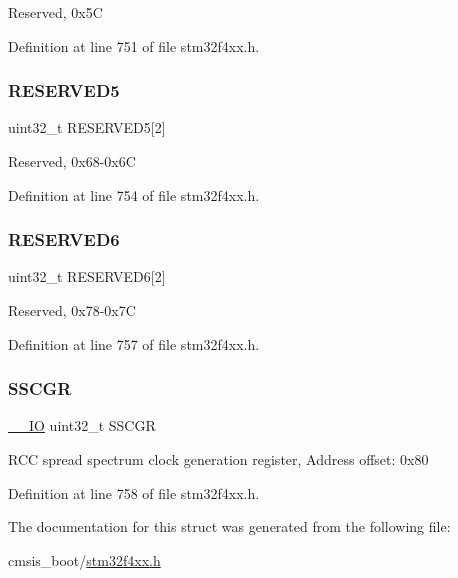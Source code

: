Reserved, 0x5C 

Definition at line 751 of file stm32f4xx.\+h.

\mbox{\label{struct_r_c_c___type_def_ac0eb05794aeee3b4ed69c8fe54c9be3b}} 
\subsubsection{\texorpdfstring{R\+E\+S\+E\+R\+V\+E\+D5}{RESERVED5}}
{\footnotesize\ttfamily uint32\+\_\+t R\+E\+S\+E\+R\+V\+E\+D5\mbox{[}2\mbox{]}}

Reserved, 0x68-\/0x6C 

Definition at line 754 of file stm32f4xx.\+h.

\mbox{\label{struct_r_c_c___type_def_a10da398d74a1f88d5b42bd40718d9447}} 
\subsubsection{\texorpdfstring{R\+E\+S\+E\+R\+V\+E\+D6}{RESERVED6}}
{\footnotesize\ttfamily uint32\+\_\+t R\+E\+S\+E\+R\+V\+E\+D6\mbox{[}2\mbox{]}}

Reserved, 0x78-\/0x7C 

Definition at line 757 of file stm32f4xx.\+h.

\mbox{\label{struct_r_c_c___type_def_aaef3da59eaf7c6dfdf9a12fd60ce58a8}} 
\subsubsection{\texorpdfstring{S\+S\+C\+GR}{SSCGR}}
{\footnotesize\ttfamily \hyperlink{group___c_m_s_i_s__core__definitions_gaec43007d9998a0a0e01faede4133d6be}{\+\_\+\+\_\+\+IO} uint32\+\_\+t S\+S\+C\+GR}

R\+CC spread spectrum clock generation register, Address offset\+: 0x80 

Definition at line 758 of file stm32f4xx.\+h.



The documentation for this struct was generated from the following file\+:\begin{DoxyCompactItemize}
\item 
cmsis\+\_\+boot/\hyperlink{stm32f4xx_8h}{stm32f4xx.\+h}\end{DoxyCompactItemize}
